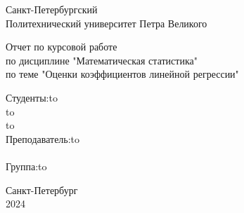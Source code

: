 \documentclass[12pt]{article}
\begin{document}
\begin{titlepage}

\Large

\begin{center}
Санкт-Петербургский \\ Политехнический университет Петра Великого

\vspace{10em}

Отчет по курсовой работе\\
по дисциплине "Математическая статистика"\\
по теме "Оценки коэффициентов линейной регрессии"\\

\vspace{2em}

\end{center}

\vspace{6em}

\newbox{\lbox}
\newlength{\maxl}
\setlength{\maxl}{\wd\lbox}
\hfill\parbox{12cm}{
\hspace*{3cm}\hspace*{-5cm}Студенты:\hfill\hbox to\\
\hspace*{3cm}\hspace*{-5cm}\hfill\hbox to\\
\hspace*{3cm}\hspace*{-5cm}\hfill\hbox to\\
\hspace*{3cm}\hspace*{-5cm}Преподаватель:\hfill\hbox to\\
\\
\hspace*{3cm}\hspace*{-5cm}Группа:\hfill\hbox to\\
}

\vspace{\fill}

\begin{center}
Санкт-Петербург \\2024
\end{center}

\end{titlepage}
\end{document}
